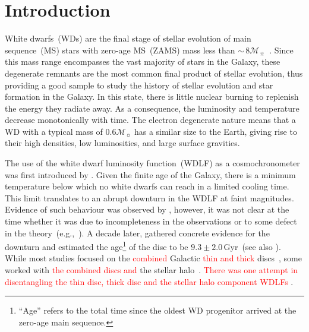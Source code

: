 \documentclass[fleqn,usenatbib]{rasti}
\newcommand{\msun}{\mathcal{M}_{\sun}}
\begin{document}
\section{Introduction}
White dwarfs~(WDs) are the final stage of stellar evolution of main
sequence~(MS) stars with zero-age MS~(ZAMS) mass less than
$\sim$\,$8\msun$~\citep{2013sse..book.....K}. Since this
mass range encompasses the vast majority of stars in the Galaxy, these
degenerate remnants are the most common final product of stellar evolution,
thus providing a good sample to study the history of stellar evolution and star
formation in the Galaxy. In this state, there is little nuclear burning to
replenish the energy they radiate away. As a consequence, the luminosity and
temperature decrease monotonically with time. The electron degenerate nature
means that a WD with a typical mass of $0.6\mathcal{M}_{\sun}$ has a similar
size to the Earth, giving rise to their high densities, low luminosities, and
large surface gravities.

The use of the white dwarf luminosity function~(WDLF) as a cosmochronometer was
first introduced by \citet{1959ApJ...129..243S}. Given the finite age of the
Galaxy, there is a minimum temperature below which no white dwarfs can reach in
a limited cooling time. This limit translates to an abrupt downturn in the WDLF
at faint magnitudes. Evidence of such behaviour was observed by
\citet{1979ApJ...233..226L}, however, it was not clear at the time whether it
was due to incompleteness in the observations or to some defect in the
theory~(e.g.,~\citealp{1984ApJ...282..615I}). A decade later,
\citet{1987ApJ...315L..77W} gathered concrete evidence for the downturn and
estimated the age\footnote{``Age'' refers to the total time since the oldest
WD progenitor arrived at the zero-age main sequence.} of the disc to be
$9.3 \pm 2.0$\,Gyr~(see also \citealt{1988ApJ...332..891L}). While most studies
focused on the \textcolor{red}{combined} Galactic \textcolor{red}{thin and thick} discs~\citep{1989LNP...328...15L, 1992ApJ...386..539W,
1995LNP...443...24O, 1998ApJ...497..294L, 1999MNRAS.306..736K,
2012ApJS..199...29G, 2021A&A...649A...6G}, some worked with \textcolor{red}{the combined discs and} the stellar
halo~\citep{2006AJ....131..571H, 2017AJ....153...10M, 2019MNRAS.482..715L}.
\textcolor{red}{There was one attempt in disentangling the thin disc, thick disc
and the stellar halo component WDLFs \citep{2011MNRAS.417...93R}}.
 
\end{document}

